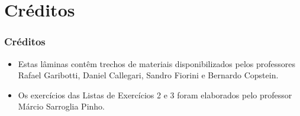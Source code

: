 \documentclass[aspectratio=169]{beamer}
\begin{document}
\section{Créditos}

\begin{frame}\frametitle{Créditos}
\begin{itemize}
	\item Estas lâminas contêm trechos de materiais disponibilizados pelos professores Rafael Garibotti, Daniel Callegari, Sandro Fiorini e Bernardo Copstein.
	\item Os exercícios das Listas de Exercícios 2 e 3 foram elaborados pelo professor Márcio Sarroglia Pinho.
\end{itemize}
\end{frame}

\end{document}
